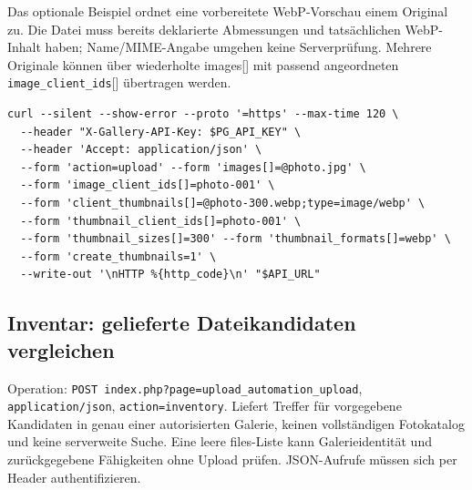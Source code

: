 \documentclass[11pt,a4paper]{article}
\newcommand{\codeword}[1]{\nolinkurl{#1}}
\begin{document}
Das optionale Beispiel ordnet eine vorbereitete WebP-Vorschau einem Original zu. Die Datei
muss bereits deklarierte Abmessungen und tatsächlichen WebP-Inhalt haben; Name/MIME-Angabe
umgehen keine Serverprüfung. Mehrere Originale können über wiederholte images[] mit passend
angeordneten \codeword{image_client_ids}[] übertragen werden.

\begin{lstlisting}[language={}]
curl --silent --show-error --proto '=https' --max-time 120 \
  --header "X-Gallery-API-Key: $PG_API_KEY" \
  --header 'Accept: application/json' \
  --form 'action=upload' --form 'images[]=@photo.jpg' \
  --form 'image_client_ids[]=photo-001' \
  --form 'client_thumbnails[]=@photo-300.webp;type=image/webp' \
  --form 'thumbnail_client_ids[]=photo-001' \
  --form 'thumbnail_sizes[]=300' --form 'thumbnail_formats[]=webp' \
  --form 'create_thumbnails=1' \
  --write-out '\nHTTP %{http_code}\n' "$API_URL"
\end{lstlisting}

\subsection{\texorpdfstring{Inventar: gelieferte Dateikandidaten vergleichen}{Inventar: gelieferte Dateikandidaten vergleichen}}

\label{api352:inventory}

Operation: \codeword{POST index.php?page=upload_automation_upload},
\codeword{application/json}, \codeword{action=inventory}. Liefert Treffer für vorgegebene
Kandidaten in genau einer autorisierten Galerie, keinen vollständigen Fotokatalog und keine
serverweite Suche. Eine leere files-Liste kann Galerieidentität und zurückgegebene
Fähigkeiten ohne Upload prüfen. JSON-Aufrufe müssen sich per Header authentifizieren.
\end{document}
